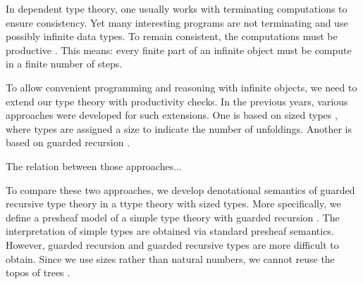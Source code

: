 In dependent type theory, one usually works with terminating computations to ensure consistency.
Yet many interesting programs are not terminating and use possibly infinite data types.
To remain consistent, the computations must be productive \cite{Coquand93}.
This means: every finite part of an infinite object must be compute in a finite number of steps.

To allow convenient programming and reasoning with infinite objects, we need to extend our type theory with productivity checks.
In the previous years, various approaches were developed for such extensions.
One is based on sized types \cite{A-sized,AVW-normalization}, where types are assigned a size to indicate the number of unfoldings.
Another is based on guarded recursion \cite{AtkeyM13,BahrGM17}.

The relation between those approaches...

To compare these two approaches, we develop denotational semantics of guarded recursive type theory in a ttype theory with sized types.
More specifically, we define a presheaf model of a simple type theory with guarded recursion \cite{BMSS-synthetic}.
The interpretation of simple types are obtained via standard presheaf semantics.
However, guarded recursion and guarded recursive types are more difficult to obtain.
Since we use sizes rather than natural numbers, we cannot reuse the topos of trees \cite{BMSS-synthetic}.